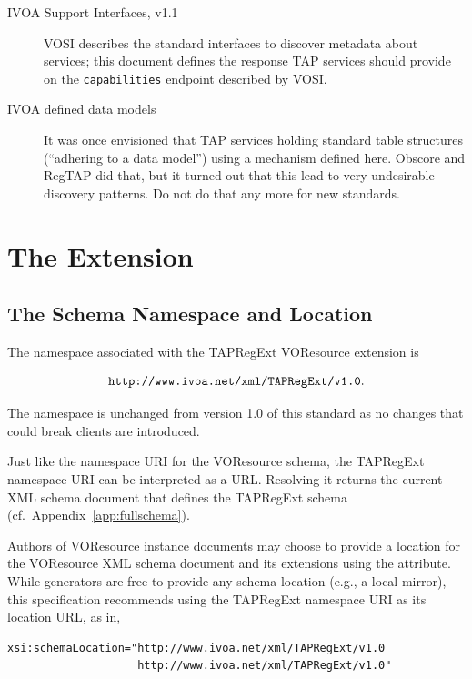 \documentclass{ivoa}
\begin{document}
\begin{description}
\item[IVOA Support Interfaces, v1.1 \citep{2017ivoa.spec.0524G}] \hfil\break VOSI describes the standard interfaces to discover metadata about
services; this document defines the response TAP services should
provide on the \texttt{capabilities} endpoint described by VOSI.
\item[IVOA defined data models] It was once envisioned that TAP services
holding standard table structures (``adhering to a data model'') using a
mechanism defined here.  Obscore
\citep{2017ivoa.spec.0509L} and RegTAP \citep{2019ivoa.spec.1011D} did
that, but it turned out that this lead to very undesirable discovery
patterns.  Do not do that any more for new standards.

\end{description}


\section{The Extension}

\label{taextension}

\subsection{The Schema Namespace and Location}

\label{nsloc}

The namespace associated with the TAPRegExt VOResource extension is

$$
\mbox{\texttt{http://www.ivoa.net/xml/TAPRegExt/v1.0}.}
$$

The namespace is unchanged from version 1.0 of this standard as no
changes that could break clients are introduced.

Just like the namespace URI for the VOResource schema, the
TAPRegExt namespace URI can be interpreted as a URL.  Resolving it
returns the current XML schema document
that defines the TAPRegExt schema (cf.~Appendix~\ref{app:fullschema}).

Authors of VOResource instance documents may choose to
provide a location for the VOResource XML schema document and its
extensions using the
 attribute.
While generators are
free to provide any schema location (e.g., a local mirror), this specification
recommends using the TAPRegExt namespace URI as its location URL,
as in,


\begin{verbatim}
xsi:schemaLocation="http://www.ivoa.net/xml/TAPRegExt/v1.0
                    http://www.ivoa.net/xml/TAPRegExt/v1.0"
\end{verbatim}
\end{document}
